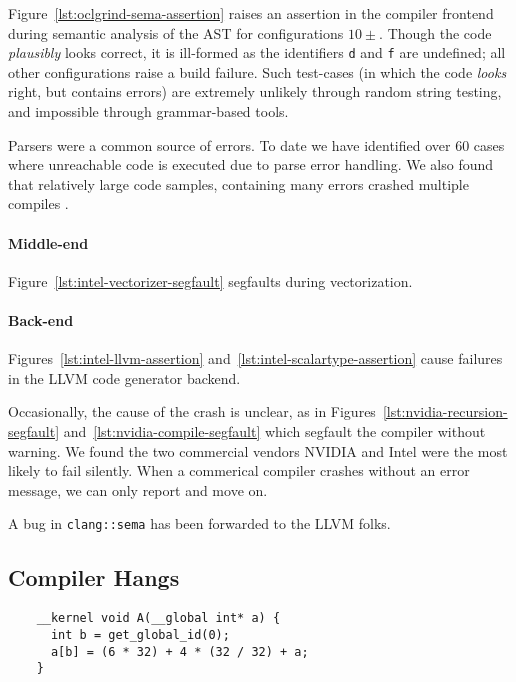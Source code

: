 Figure~\ref{lst:oclgrind-sema-assertion} raises an assertion in the compiler frontend during semantic analysis of the AST for configurations $10\pm$. Though the code \emph{plausibly} looks correct, it is ill-formed as the identifiers \texttt{d} and \texttt{f} are undefined; all other configurations raise a build failure. Such test-cases (in which the code \emph{looks} right, but contains errors) are extremely unlikely through random string testing, and impossible through grammar-based tools.

Parsers were a common source of errors. To date we have identified over 60 cases where unreachable code is executed due to parse error handling. We also found that relatively large code samples, containing many errors crashed multiple compiles .

\paragraph{Middle-end} Figure~\ref{lst:intel-vectorizer-segfault} segfaults during vectorization.

\paragraph{Back-end} Figures~\ref{lst:intel-llvm-assertion} and~\ref{lst:intel-scalartype-assertion} cause failures in the LLVM code generator backend.

Occasionally, the cause of the crash is unclear, as in Figures~\ref{lst:nvidia-recursion-segfault} and~\ref{lst:nvidia-compile-segfault} which segfault the compiler without warning. We found the two commercial vendors NVIDIA and Intel were the most likely to fail silently. When a commerical compiler crashes without an error message, we can only report and move on.

A bug in \texttt{clang::sema} has been forwarded to the LLVM folks.


\subsection{Compiler Hangs}

\newsavebox{\IntelPtrCompilerHang}
\begin{lrbox}{\IntelPtrCompilerHang}
  \hspace{1.5em}
  \begin{lstlisting}
    __kernel void A(__global int* a) {
      int b = get_global_id(0);
      a[b] = (6 * 32) + 4 * (32 / 32) + a;
    }
  \end{lstlisting}
\end{lrbox}

